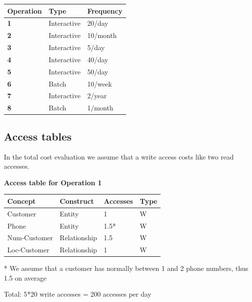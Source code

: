 \documentclass{article}[h]
\begin{document}
\begin{table}[H]
  \def\arraystretch{1.25}%
  \centering
  \begin{tabular}{ | m{2.5cm} | m{3.5cm}| m{3.5cm} |}  
    \hline
    {\textbf{\large Operation}} & {\textbf{\large Type}} & {\textbf{\large Frequency}} \\ 
    \hline
    \color[HTML]{3531FF} \textbf{1} & Interactive & 20/day  \\ 
    \hline
    \color[HTML]{3531FF} \textbf{2} & Interactive & 10/month  \\ 
    \hline
    \color[HTML]{3531FF} \textbf{3} & Interactive & 5/day  \\ 
    \hline
    \color[HTML]{3531FF} \textbf{4} & Interactive & 40/day  \\ 
    \hline
    \color[HTML]{3531FF} \textbf{5} & Interactive & 50/day  \\ 
    \hline
    \color[HTML]{3531FF} \textbf{6} & Batch & 10/week  \\ 
    \hline
    \color[HTML]{3531FF} \textbf{7} & Interactive & 2/year  \\ 
    \hline
    \color[HTML]{3531FF} \textbf{8} & Batch & 1/month  \\ 
    \hline
  \end{tabular}
\end{table}

\pagebreak

\subsection{Access tables}

In the total cost evaluation we assume that a write access costs like two read accesses.

\vspace{12px}

{\centering \textbf{Access table for Operation 1}\\}
\begin{table}[H]
  \def\arraystretch{1.10}%
  \centering
  \begin{tabular}{ | m{4cm} | m{4cm}| m{3cm} | m{2cm} |} 
    \hline
    {\textbf{\large Concept}} & {\textbf{\large Construct}} & {\textbf{\large Accesses}} & {\textbf{\large Type}} \\
    \hline
    \color[HTML]{3531FF} Customer & Entity & 1 & W \\ 
    \hline
    \color[HTML]{3531FF} Phone & Entity & 1.5* & W \\ 
    \hline
    \color[HTML]{3531FF} Num-Customer & Relationship & 1.5 & W \\ 
    \hline
    \color[HTML]{3531FF} Loc-Customer & Relationship & 1 & W \\ 
    \hline
  \end{tabular}
  * \small{We assume that a customer has normally between 1 and 2 phone numbers, thus 1.5 on average}
\end{table}
Total: 5*20 write accesses = 200 accesses per day
\end{document}
